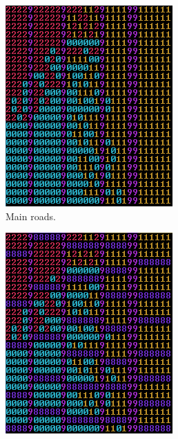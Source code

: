 	\begin{figure}[h]
		\begin{subfigure}{0.5\textwidth}
			\centering
			\includegraphics[width=0.9\linewidth]{"Images/map main roads colored"}
			\caption{Main roads.}
			\label{fig:map-main-roads}
		\end{subfigure}
		\begin{subfigure}{0.5\textwidth}
			\centering
			\includegraphics[width=0.9\linewidth]{"Images/map small roads colored"}

\end{subfigure}
\end{figure}
